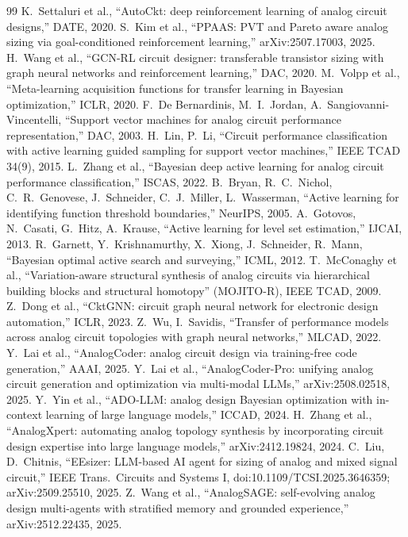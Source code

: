 \documentclass[10pt]{article}
\begin{document}
\begin{thebibliography}{99}\small\setlength{\itemsep}{0pt}
 K.~Settaluri et al., ``AutoCkt: deep reinforcement learning of analog circuit designs,'' DATE, 2020.
 S.~Kim et al., ``PPAAS: PVT and Pareto aware analog sizing via goal-conditioned reinforcement learning,'' arXiv:2507.17003, 2025.
 H.~Wang et al., ``GCN-RL circuit designer: transferable transistor sizing with graph neural networks and reinforcement learning,'' DAC, 2020.
 M.~Volpp et al., ``Meta-learning acquisition functions for transfer learning in Bayesian optimization,'' ICLR, 2020.
 F.~De Bernardinis, M.~I.~Jordan, A.~Sangiovanni-Vincentelli, ``Support vector machines for analog circuit performance representation,'' DAC, 2003.
 H.~Lin, P.~Li, ``Circuit performance classification with active learning guided sampling for support vector machines,'' IEEE TCAD 34(9), 2015.
 L.~Zhang et al., ``Bayesian deep active learning for analog circuit performance classification,'' ISCAS, 2022.
 B.~Bryan, R.~C.~Nichol, C.~R.~Genovese, J.~Schneider, C.~J.~Miller, L.~Wasserman, ``Active learning for identifying function threshold boundaries,'' NeurIPS, 2005.
 A.~Gotovos, N.~Casati, G.~Hitz, A.~Krause, ``Active learning for level set estimation,'' IJCAI, 2013.
 R.~Garnett, Y.~Krishnamurthy, X.~Xiong, J.~Schneider, R.~Mann, ``Bayesian optimal active search and surveying,'' ICML, 2012.
 T.~McConaghy et al., ``Variation-aware structural synthesis of analog circuits via hierarchical building blocks and structural homotopy'' (MOJITO-R), IEEE TCAD, 2009.
 Z.~Dong et al., ``CktGNN: circuit graph neural network for electronic design automation,'' ICLR, 2023.
 Z.~Wu, I.~Savidis, ``Transfer of performance models across analog circuit topologies with graph neural networks,'' MLCAD, 2022.
 Y.~Lai et al., ``AnalogCoder: analog circuit design via training-free code generation,'' AAAI, 2025.
 Y.~Lai et al., ``AnalogCoder-Pro: unifying analog circuit generation and optimization via multi-modal LLMs,'' arXiv:2508.02518, 2025.
 Y.~Yin et al., ``ADO-LLM: analog design Bayesian optimization with in-context learning of large language models,'' ICCAD, 2024.
 H.~Zhang et al., ``AnalogXpert: automating analog topology synthesis by incorporating circuit design expertise into large language models,'' arXiv:2412.19824, 2024.
 C.~Liu, D.~Chitnis, ``EEsizer: LLM-based AI agent for sizing of analog and mixed signal circuit,'' IEEE Trans.\ Circuits and Systems I, doi:10.1109/TCSI.2025.3646359; arXiv:2509.25510, 2025.
 Z.~Wang et al., ``AnalogSAGE: self-evolving analog design multi-agents with stratified memory and grounded experience,'' arXiv:2512.22435, 2025.
\end{thebibliography}
\end{document}
